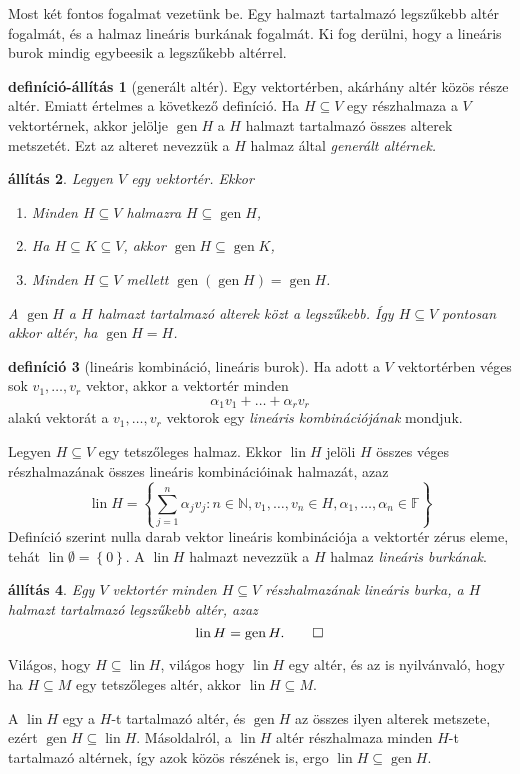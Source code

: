 \documentclass[a4paper, showtrims]{memoir}
\makeatletter
\renewenvironment{proof}[1][\proofname]
    {\par\pushQED{\qed}%
    \normalfont \topsep6\p@\@plus6\p@\relax
    \trivlist
    \item[\hskip\labelsep
        \itshape
    #1\@addpunct{:}]\ignorespaces}
    {\popQED\endtrivlist\@endpefalse}
\theoremstyle{plain}
\newtheorem{proposition}{állítás}[chapter]
\theoremstyle{remark}
\theoremstyle{definition}
\newtheorem{definition}[proposition]{definíció}
\newtheorem{defprop}[proposition]{definíció-állítás}
\DeclareMathOperator{\lin}{lin}
\DeclareMathOperator{\gen}{gen}
\makeatother
\begin{document}
Most két fontos fogalmat vezetünk be.
Egy halmazt tartalmazó legszűkebb altér fogalmát,
és a halmaz lineáris burkának fogalmát.
Ki fog derülni, hogy a lineáris burok mindig egybeesik a legszűkebb altérrel.
\begin{defprop}[generált altér]
	Egy vektortérben, akárhány altér közös része altér.
	Emiatt értelmes a következő definíció.
	Ha $H\subseteq V$ egy részhalmaza a $V$ vektortérnek,
	akkor jelölje
	$\gen H$ a $H$ halmazt tartalmazó összes alterek metszetét.
	Ezt az alteret nevezzük a $H$ halmaz által \emph{generált altérnek.}
\end{defprop}
\begin{proposition}
	Legyen $V$ egy vektortér.
	Ekkor
	\begin{enumerate}
		\item Minden $H\subseteq V$ halmazra $H\subseteq \gen H$,
		\item Ha $H\subseteq K\subseteq V$, akkor $\gen H\subseteq \gen K$,
		\item Minden $H\subseteq V$ mellett $\gen\left( \gen H \right)=\gen H$.
	\end{enumerate}
	A $\gen H$ a $H$ halmazt tartalmazó alterek közt a legszűkebb.
	Így $H\subseteq V$ pontosan akkor altér, ha $\gen H=H$.
\end{proposition}
\begin{definition}[lineáris kombináció, lineáris burok]
	Ha adott a $V$ vektortérben véges sok $v_1,\ldots,v_r$ vektor,
	akkor a vektortér minden
	\[
		\alpha_1v_1+\dots+\alpha_r v_r
	\]
	alakú vektorát a $v_1,\ldots,v_r$ vektorok egy \emph{lineáris kombinációjának} mondjuk.

	Legyen $H\subseteq V$ egy tetszőleges halmaz.
	Ekkor $\lin H$ jelöli $H$ összes véges részhalmazának összes lineáris kombinációinak halmazát,
	azaz
	\[
		\lin H=
		\left\{ \sum_{j=1}^n\alpha_jv_j:n\in\mathbb{N},v_1,\ldots,v_n\in H,\alpha_1,\ldots,\alpha_n\in\mathbb{F} \right\}
	\]
	Definíció szerint nulla darab vektor lineáris kombinációja a vektortér zérus eleme,
	tehát $\lin \emptyset=\left\{ 0 \right\}.$
	A $\lin H$ halmazt nevezzük a $H$ halmaz \emph{lineáris burkának}.
\end{definition}
\begin{proposition}
	Egy $V$ vektortér minden $H\subseteq V$ részhalmazának lineáris burka,
	a $H$ halmazt tartalmazó legszűkebb altér, azaz
	\[
		\lin H=\gen H.\qedhere
	\]
\end{proposition}
\begin{proof}
	Világos, hogy $H\subseteq \lin H$, világos hogy $\lin H$ egy altér,
	és az is nyilvánvaló, hogy ha $H\subseteq M$ egy tetszőleges altér,
	akkor $\lin H\subseteq M$.

	A $\lin H$ egy a $H$-t tartalmazó altér,
	és $\gen H$ az összes ilyen alterek metszete, ezért
	$\gen H\subseteq\lin H$.
	Másoldalról, a $\lin H$ altér részhalmaza minden $H$-t tartalmazó altérnek,
	így azok közös részének is,
	ergo
	$\lin H\subseteq \gen H$.
\end{proof}
\end{document}
